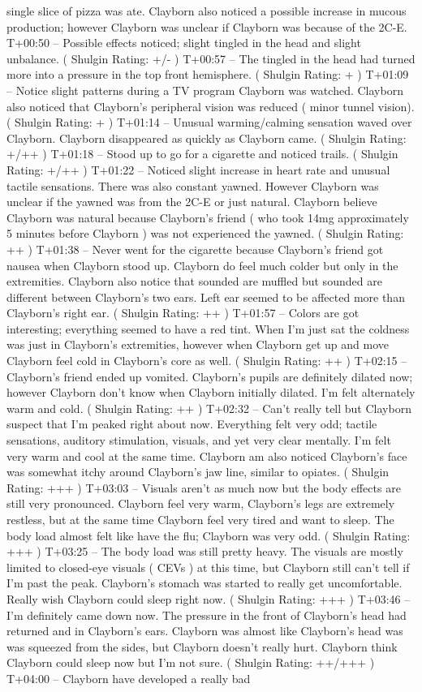 \documentclass[12pt]{book}
\begin{document}
single slice of pizza was ate. Clayborn also noticed a possible increase in mucous production; however Clayborn was unclear if Clayborn was because of the 2C-E. T+00:50 -- Possible effects noticed; slight tingled in the head and slight unbalance. ( Shulgin Rating: +/- ) T+00:57 -- The tingled in the head had turned more into a pressure in the top front hemisphere. ( Shulgin Rating: + ) T+01:09 -- Notice slight patterns during a TV program Clayborn was watched. Clayborn also noticed that Clayborn's peripheral vision was reduced ( minor tunnel vision). ( Shulgin Rating: + ) T+01:14 -- Unusual warming/calming sensation waved over Clayborn. Clayborn disappeared as quickly as Clayborn came. ( Shulgin Rating: +/++ ) T+01:18 -- Stood up to go for a cigarette and noticed trails. ( Shulgin Rating: +/++ ) T+01:22 -- Noticed slight increase in heart rate and unusual tactile sensations. There was also constant yawned. However Clayborn was unclear if the yawned was from the 2C-E or just natural. Clayborn believe Clayborn was natural because Clayborn's friend ( who took 14mg approximately 5 minutes before Clayborn ) was not experienced the yawned. ( Shulgin Rating: ++ ) T+01:38 -- Never went for the cigarette because Clayborn's friend got nausea when Clayborn stood up. Clayborn do feel much colder but only in the extremities. Clayborn also notice that sounded are muffled but sounded are different between Clayborn's two ears. Left ear seemed to be affected more than Clayborn's right ear. ( Shulgin Rating: ++ ) T+01:57 -- Colors are got interesting; everything seemed to have a red tint. When I'm just sat the coldness was just in Clayborn's extremities, however when Clayborn get up and move Clayborn feel cold in Clayborn's core as well. ( Shulgin Rating: ++ ) T+02:15 -- Clayborn's friend ended up vomited. Clayborn's pupils are definitely dilated now; however Clayborn don't know when Clayborn initially dilated. I'm felt alternately warm and cold. ( Shulgin Rating: ++ ) T+02:32 -- Can't really tell but Clayborn suspect that I'm peaked right about now. Everything felt very odd; tactile sensations, auditory stimulation, visuals, and yet very clear mentally. I'm felt very warm and cool at the same time. Clayborn am also noticed Clayborn's face was somewhat itchy around Clayborn's jaw line, similar to opiates. ( Shulgin Rating: +++ ) T+03:03 -- Visuals aren't as much now but the body effects are still very pronounced. Clayborn feel very warm, Clayborn's legs are extremely restless, but at the same time Clayborn feel very tired and want to sleep. The body load almost felt like have the flu; Clayborn was very odd. ( Shulgin Rating: +++ ) T+03:25 -- The body load was still pretty heavy. The visuals are mostly limited to closed-eye visuals ( CEVs ) at this time, but Clayborn still can't tell if I'm past the peak. Clayborn's stomach was started to really get uncomfortable. Really wish Clayborn could sleep right now. ( Shulgin Rating: +++ ) T+03:46 -- I'm definitely came down now. The pressure in the front of Clayborn's head had returned and in Clayborn's ears. Clayborn was almost like Clayborn's head was was squeezed from the sides, but Clayborn doesn't really hurt. Clayborn think Clayborn could sleep now but I'm not sure. ( Shulgin Rating: ++/+++ ) T+04:00 -- Clayborn have developed a really bad 
\end{document}
